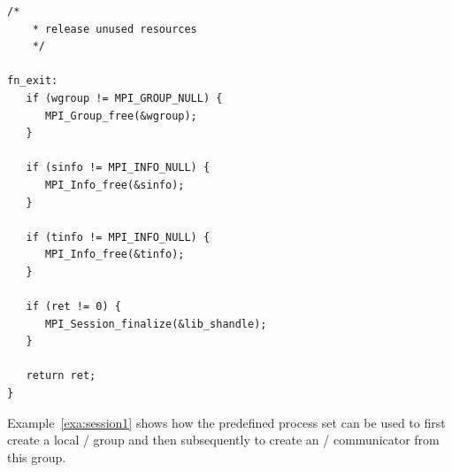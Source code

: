 \begin{example}
\begin{lstlisting}[language={[MPI]C}]
   /*
    * release unused resources
    */

fn_exit:
   if (wgroup != MPI_GROUP_NULL) {
      MPI_Group_free(&wgroup);
   }

   if (sinfo != MPI_INFO_NULL) {
      MPI_Info_free(&sinfo);
   }

   if (tinfo != MPI_INFO_NULL) {
      MPI_Info_free(&tinfo);
   }

   if (ret != 0) {
      MPI_Session_finalize(&lib_shandle);
   }

   return ret;
}
\end{lstlisting}
\end{example}

Example~\ref{exa:session1} shows how the predefined  process set can be used to
first create a local \MPI/ group and then subsequently to create an \MPI/ communicator from this
group. 

